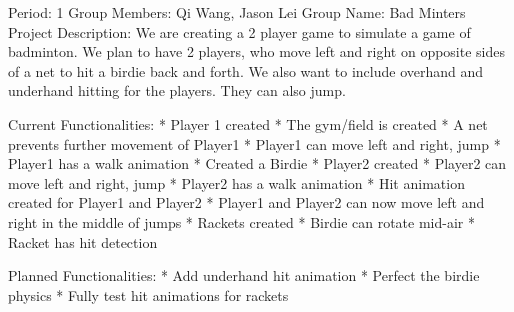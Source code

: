 Period: 1
Group Members: Qi Wang, Jason Lei
Group Name: Bad Minters
Project Description: We are creating a 2 player game to simulate a game of badminton. We plan to have 2 players, who move left and right on opposite sides of a net to hit a birdie back and forth. We also want to include overhand and underhand hitting for the players. They can also jump. 

Current Functionalities:
* Player 1 created
* The gym/field is created
* A net prevents further movement of Player1
* Player1 can move left and right, jump
* Player1 has a walk animation
* Created a Birdie
* Player2 created
* Player2 can move left and right, jump
* Player2 has a walk animation
* Hit animation created for Player1 and Player2
* Player1 and Player2 can now move left and right in the middle of jumps
* Rackets created
* Birdie can rotate mid-air
* Racket has hit detection 


Planned Functionalities: 
* Add underhand hit animation
* Perfect the birdie physics
* Fully test hit animations for rackets




